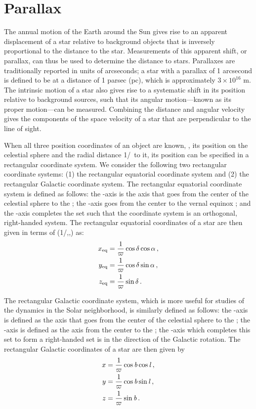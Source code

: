\section{Parallax}

The annual motion of the Earth around the Sun gives rise to an
apparent displacement of a star relative to background objects that is
inversely proportional to the distance to the star. Measurements of
this apparent shift, or parallax, can thus be used to determine the
distance to stars. Parallaxes are traditionally reported in units of
arcseconds; a star with a parallax of 1 arcsecond is defined to be at
a distance of 1 parsec (pc), which is approximately $3\times 10^{16}$
m. The intrinsic motion of a star also gives rise to a systematic
shift in its position relative to background sources, such that its
angular motion---known as its proper motion---can be
measured. Combining the distance and angular velocity gives the
components of the space velocity of a star that are perpendicular to
the line of sight.

When all three position coordinates of an object are known, \ie, its
position on the celestial sphere and the radial distance
1/\parallax\ to it, its position can be specified in a rectangular
coordinate system. We consider the following two rectangular
coordinate systems: (1) the rectangular equatorial coordinate system
and (2) the rectangular Galactic coordinate system. The rectangular
equatorial coordinate system is defined as follows: the \eqz-axis is
the axis that goes from the center of the celestial sphere to the
\ncp; the \eqx-axis goes from the center to the vernal equinox
\vernal; and the \eqy-axis completes the set such that the coordinate
system is an orthogonal, right-handed system. The rectangular
equatorial coordinates of a star are then given in terms of
(1/\parallax,\ra,\dec) as:
\begin{align}\label{eq:receq}
x_{\textnormal{eq}} &= \frac{1}{\varpi} \cos \delta \cos \alpha\, ,\\
y_{\textnormal{eq}} &= \frac{1}{\varpi} \cos \delta \sin \alpha\, ,\\
z_{\textnormal{eq}} &= \frac{1}{\varpi} \sin \delta\, .
\end{align}

The rectangular Galactic coordinate system, which is more useful for
studies of the dynamics in the Solar neighborhood, is similarly
defined as follows: the \galz-axis is defined as the axis that goes
from the center of the celestial sphere to the \ngp; the \galx-axis is
defined as the axis from the center to the \gc; the \galy-axis which
completes this set to form a right-handed set is in the direction of
the Galactic rotation. The rectangular Galactic coordinates of a star
are then given by
\begin{align}\label{eq:recgal}
x &= \frac{1}{\varpi} \cos {\it b} \cos {\it l}\, ,\\
y &= \frac{1}{\varpi} \cos {\it b} \sin {\it l}\, ,\\
z &= \frac{1}{\varpi} \sin {\it b}\, .
\end{align}


